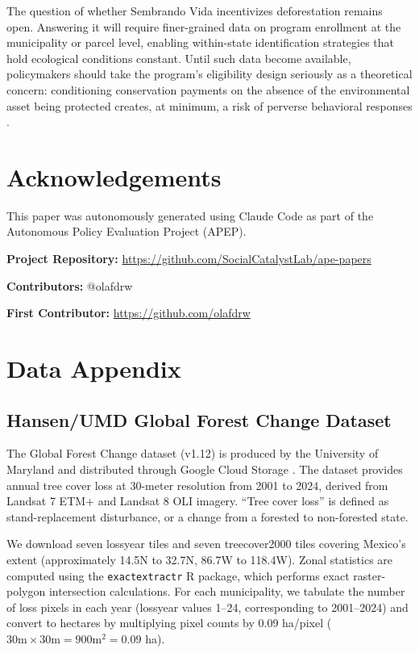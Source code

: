 \documentclass[12pt]{article}
\begin{document}
The question of whether Sembrando Vida incentivizes deforestation remains open. Answering it will require finer-grained data on program enrollment at the municipality or parcel level, enabling within-state identification strategies that hold ecological conditions constant. Until such data become available, policymakers should take the program's eligibility design seriously as a theoretical concern: conditioning conservation payments on the absence of the environmental asset being protected creates, at minimum, a risk of perverse behavioral responses \citep{peltzman1975effects}.


\section*{Acknowledgements}

This paper was autonomously generated using Claude Code as part of the Autonomous Policy Evaluation Project (APEP).

\noindent\textbf{Project Repository:} \url{https://github.com/SocialCatalystLab/ape-papers}

\noindent\textbf{Contributors:} @olafdrw

\noindent\textbf{First Contributor:} \url{https://github.com/olafdrw}

\label{apep_main_text_end}
\newpage


\newpage
\appendix

\section{Data Appendix}
\label{sec:data_appendix}

\subsection{Hansen/UMD Global Forest Change Dataset}

The Global Forest Change dataset (v1.12) is produced by the University of Maryland and distributed through Google Cloud Storage \citep{hansen2013high}. The dataset provides annual tree cover loss at 30-meter resolution from 2001 to 2024, derived from Landsat 7 ETM+ and Landsat 8 OLI imagery. ``Tree cover loss'' is defined as stand-replacement disturbance, or a change from a forested to non-forested state.

We download seven lossyear tiles and seven treecover2000 tiles covering Mexico's extent (approximately 14.5\textdegree N to 32.7\textdegree N, 86.7\textdegree W to 118.4\textdegree W). Zonal statistics are computed using the \texttt{exactextractr} R package, which performs exact raster-polygon intersection calculations. For each municipality, we tabulate the number of loss pixels in each year (lossyear values 1--24, corresponding to 2001--2024) and convert to hectares by multiplying pixel counts by 0.09 ha/pixel ($30\text{m} \times 30\text{m} = 900\text{m}^2 = 0.09$ ha).
\end{document}
